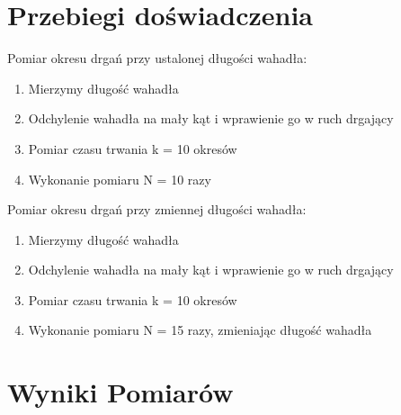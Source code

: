 \documentclass[18pt, twoside]{article}
\begin{document}
\section{Przebiegi doświadczenia}
Pomiar okresu drgań przy ustalonej długości wahadła:
\begin{enumerate}
	\item Mierzymy długość wahadła
	\item Odchylenie wahadła na mały kąt i wprawienie go w ruch drgający
	\item Pomiar czasu trwania k = 10 okresów
	\item Wykonanie pomiaru N = 10 razy
\end{enumerate}
Pomiar okresu drgań przy zmiennej długości wahadła: 
\begin{enumerate}
	\item Mierzymy długość wahadła
	\item Odchylenie wahadła na mały kąt i wprawienie go w ruch drgający
	\item Pomiar czasu trwania k = 10 okresów
	\item Wykonanie pomiaru N = 15 razy, zmieniając długość wahadła
\end{enumerate}
\section{Wyniki Pomiarów}
\end{document}
